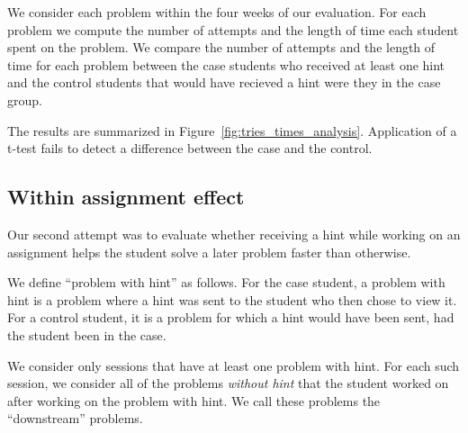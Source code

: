 \documentclass{sigchi/sigchi}
\begin{document}
We consider each problem within the four weeks of our evaluation. For
each problem we compute the number of attempts and the length of time
each student spent on the problem. We compare the number of attempts
and the length of time for each problem between the case students who
received at least one hint and the control students
that would have recieved a hint were they in the case group.

The results are summarized in
Figure~\ref{fig:tries_times_analysis}. Application of a t-test fails
to detect a difference between the case and the control.

\subsection{Within assignment effect}

Our second attempt was to evaluate whether receiving a hint while
working on an assignment helps the student solve a later problem faster
than otherwise.

We define ``problem with hint'' as follows. For the case student, a
problem with hint is a problem where a hint was sent to the student
who then chose to view it. For a control student, it is a problem for
which a hint would have been sent, had the student been in the case.

We consider only sessions that have at least one problem with
hint. For each such session, we consider all of the problems {\em
  without hint} that the student worked on after working on the
problem with hint. We call these problems the ``downstream'' problems.
\end{document}
